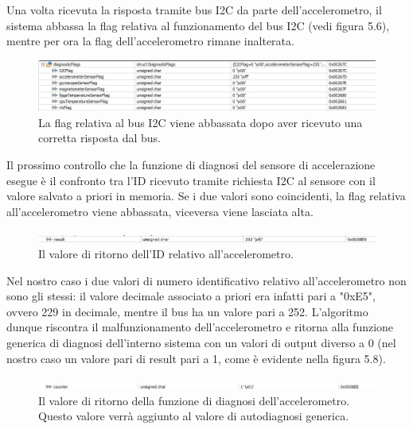 \documentclass[LaM,binding=0.6cm,oneside]{../sapthesis}
\begin{document}
Una volta ricevuta la risposta tramite bus I2C da parte dell'accelerometro, il sistema abbassa la flag relativa al funzionamento del bus I2C (vedi figura 5.6), mentre per ora la flag dell'accelerometro rimane inalterata.\newline

\begin{figure}[htbp]
\centerline{\includegraphics[scale=0.6]{examples/3_accelerometerI2CGoodConnection.JPG}}
\caption{La flag relativa al bus I2C viene abbassata dopo aver ricevuto una corretta risposta dal bus.}
\label{fig}
\end{figure}

Il prossimo controllo che la funzione di diagnosi del sensore di accelerazione esegue è il confronto tra l'ID ricevuto tramite richiesta I2C al sensore con il valore salvato a priori in memoria. Se i due valori sono coincidenti, la flag relativa all'accelerometro viene abbassata, viceversa viene lasciata alta.\newline

\begin{figure}[htbp]
\centerline{\includegraphics[scale=0.65]{examples/4_badAccelerometerId.JPG}}
\caption{Il valore di ritorno dell'ID relativo all'accelerometro.}
\label{fig}
\end{figure}

Nel nostro caso i due valori di numero identificativo relativo all'accelerometro non sono gli stessi: il valore decimale associato a priori era infatti pari a "0xE5", ovvero 229 in decimale, mentre il bus ha un valore pari a 252. L'algoritmo dunque riscontra il malfunzionamento dell'accelerometro e ritorna alla funzione generica di diagnosi dell'interno sistema con un valori di output diverso a 0 (nel nostro caso un valore pari di result pari a 1, come è evidente nella figura 5.8).\newline

\begin{figure}[htbp]
\centerline{\includegraphics[scale=0.6]{examples/5_accelerometerCounter.JPG}}
\caption{Il valore di ritorno della funzione di diagnosi dell'accelerometro. Questo valore verrà aggiunto al valore di autodiagnosi generica.}
\label{fig}
\end{figure}
\end{document}
